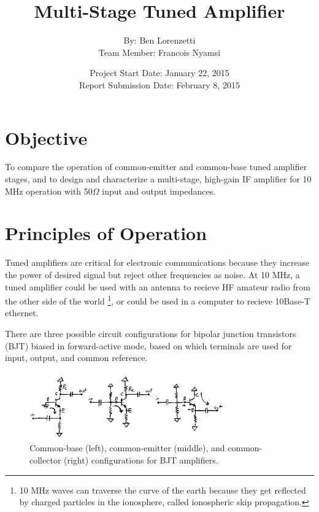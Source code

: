 \documentclass[titlepage, letterpaper, twoside, 10.5pt]{article}
\begin{document}
\title{Multi-Stage Tuned Amplifier}
\author{By: Ben Lorenzetti\\
Team Member: Francois Nyamsi}
\date{Project Start Date: January 22, 2015\\
Report Submission Date: February 8, 2015}
\maketitle

\section{Objective}

To compare the operation of common-emitter and common-base tuned
amplifier stages, and to design and characterize a multi-stage,
high-gain IF amplifier for 10 MHz operation with 50$\Omega$ input and
output impedances.

\newpage
\section{Principles of Operation}

Tuned amplifiers are critical for electronic communications because
they increase the power of desired signal but reject other frequencies
as noise. At 10 MHz, a tuned amplifier could be used with an antenna
to recieve HF amateur radio from the other side of the world
\footnote{10 MHz waves can traverse the curve of the earth because
they get reflected by charged particles in the ionosphere, called
ionospheric skip propagation.},
or could be used in a computer to recieve 10Base-T ethernet.

There are three possible circuit configurations for bipolar junction
transistors (BJT) biased in forward-active mode, based on
which terminals are used for input, output, and common reference.

\begin{figure}[ht]
	\centering
	\includegraphics[width=0.75\textwidth]
		{figures/BJTforwardBiasConfigurations.png}
	\caption{
		Common-base (left), common-emitter (middle), and
		common-collector (right) configurations for BJT
		amplifiers.
	}
	\label{BJTforwardBiasConfigurations}
\end{figure}
\end{document}
